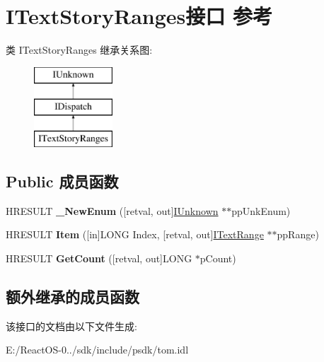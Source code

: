 \hypertarget{interface_i_text_story_ranges}{}\section{I\+Text\+Story\+Ranges接口 参考}
\label{interface_i_text_story_ranges}
类 I\+Text\+Story\+Ranges 继承关系图\+:\begin{figure}[H]
\begin{center}
\leavevmode
\includegraphics[height=3.000000cm]{interface_i_text_story_ranges}
\end{center}
\end{figure}
\subsection*{Public 成员函数}
\begin{DoxyCompactItemize}
\item 
\mbox{\label{interface_i_text_story_ranges_afa26e178223b39088a1dadb5a59c1fe3}} 
H\+R\+E\+S\+U\+LT {\bfseries \+\_\+\+New\+Enum} (\mbox{[}retval, out\mbox{]}\hyperlink{interface_i_unknown}{I\+Unknown} $\ast$$\ast$pp\+Unk\+Enum)
\item 
\mbox{\label{interface_i_text_story_ranges_a62884a04947a4d0fb660d6f5eea7f853}} 
H\+R\+E\+S\+U\+LT {\bfseries Item} (\mbox{[}in\mbox{]}L\+O\+NG Index, \mbox{[}retval, out\mbox{]}\hyperlink{interface_i_text_range}{I\+Text\+Range} $\ast$$\ast$pp\+Range)
\item 
\mbox{\label{interface_i_text_story_ranges_a0edb90260a5effcee32577ccbb8ff9c5}} 
H\+R\+E\+S\+U\+LT {\bfseries Get\+Count} (\mbox{[}retval, out\mbox{]}L\+O\+NG $\ast$p\+Count)
\end{DoxyCompactItemize}
\subsection*{额外继承的成员函数}


该接口的文档由以下文件生成\+:\begin{DoxyCompactItemize}
\item 
E\+:/\+React\+O\+S-\/0../sdk/include/psdk/tom.\+idl\end{DoxyCompactItemize}
